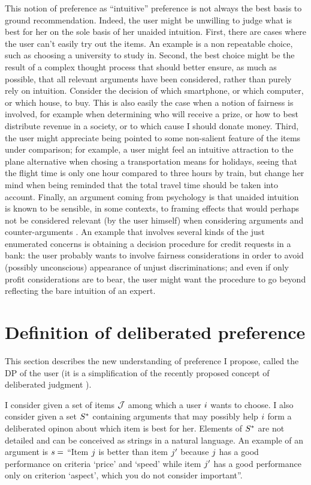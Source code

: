 \documentclass[french, english]{da2pl2018}
\begin{document}
This notion of preference as “intuitive” preference is not always the best basis to ground recommendation. Indeed, the user might be unwilling to judge what is best for her on the sole basis of her unaided intuition. First, there are cases where the user can’t easily try out the items. An example is a non repeatable choice, such as choosing a university to study in. 
Second, the best choice might be the result of a complex thought process that should better ensure, as much as possible, that all relevant arguments have been considered, rather than purely rely on intuition.
Consider the decision of which smartphone, or which computer, or which house, to buy. 
This is also easily the case when a notion of fairness is involved, for example when determining who will receive a prize, or how to best distribute revenue in a society, or to which cause I should donate money.
Third, the user might appreciate being pointed to some non-salient feature of the items under comparison; for example, a user might feel an intuitive attraction to the plane alternative when chosing a transportation means for holidays, seeing that the flight time is only one hour compared to three hours by train, but change her mind when being reminded that the total travel time should be taken into account. Finally, an argument coming from psychology is that unaided intuition is known to be sensible, in some contexts, to framing effects that would perhaps not be considered relevant (by the user himself) when considering arguments and counter-arguments \citep{kahneman_thinking_2013}. An example that involves several kinds of the just enumerated concerns is obtaining a decision procedure for credit requests in a bank: the user probably wants to involve fairness considerations in order to avoid (possibly unconscious) appearance of unjust discriminations; and even if only profit considerations are to bear, the user might want the procedure to go beyond reflecting the bare intuition of an expert.

\section{Definition of deliberated preference}
\label{sec:def}
This section describes the new understanding of preference I propose, called the \ac{DP} of the user (it is a simplification of the recently proposed concept of deliberated judgment \citep{cailloux_formal_2018}).

I consider given a set of items $\mathcal{J}$ among which a user $i$ wants to choose. I also consider given a set $S^*$ containing arguments that may possibly help $i$ form a deliberated opinon about which item is best for her. Elements of $S^*$ are not detailed and can be conceived as strings in a natural language. An example of an argument is $s = $ “Item $j$ is better than item $j'$ because $j$ has a good performance on criteria ‘price’ and ‘speed’ while item $j'$ has a good performance only on criterion ‘aspect’, which you do not consider important”.
\end{document}
